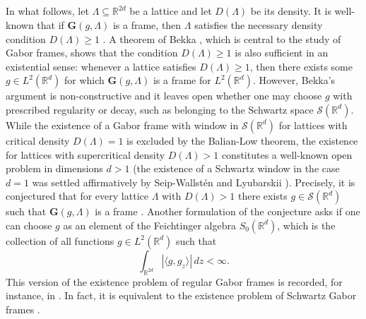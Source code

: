 \documentclass[reqno,a4paper,12pt]{amsart}
\numberwithin{equation}{section}
\def\R{{\mathbb R}}
\newcommand{\Rd}{{\R^d}}
\newcommand{\ltd}{{L^2(\R^d)}}
\newcommand\1{\mathds{1}}
\begin{document}
\subsection{}
In what follows, let $\Lambda \subseteq \R^{2d}$ be a lattice and let $D(\Lambda)$ be its density. It is well-known that if $\mathbf{G}(g,\Lambda)$ is a frame, then $\Lambda$ satisfies the necessary density condition $D(\Lambda)\geq 1$ \cite{heil2007history}.
A theorem of Bekka \cite{bekka2004square}, which is central to the study of Gabor frames, shows that the condition $D(\Lambda)\geq 1$ is also sufficient in an existential sense: whenever a lattice satisfies $D(\Lambda) \geq 1$, then there exists some $g \in \ltd$ for which $\mathbf{G}(g,\Lambda)$ is a frame for $L^2(\mathbb{R}^d)$. However, Bekka's argument is non-constructive and it leaves open whether one may choose $g$ with prescribed regularity or decay, such as belonging to the Schwartz space $\mathcal{S}(\Rd)$. While the existence of a Gabor frame with window in $\mathcal{S}(\Rd)$ for lattices with critical density $D(\Lambda)=1$ is excluded by the Balian-Low theorem, the existence for lattices with supercritical density $D(\Lambda)>1$ constitutes a well-known open problem in dimensions $d>1$ (the existence of a Schwartz window in the case $d=1$ was settled affirmatively by Seip-Wallstén and Lyubarskii \cite{Seip1992,Seip+1992+91+106,lyubarskiiframes}). Precisely, it is conjectured that for every lattice $\Lambda$ with $D(\Lambda)>1$ there exists $g \in \mathcal{S}(\Rd)$ such that $\mathbf{G}(g,\Lambda)$ is a frame \cite[p.~225]{grochenig2011multivariate}.
Another formulation of the conjecture asks if one can choose $g$ as an element of the Feichtinger algebra $S_0(\Rd)$, which is the collection of all functions $g \in \ltd$ such that
$$
\int_{\R^{2d}} |\langle g,g_z \rangle| \, dz < \infty.
$$
This version of the existence problem of regular Gabor frames is recorded, for instance, in \cite{jakobsen2020duality}. In fact, it is equivalent to the existence problem of Schwartz Gabor frames \cite[Proposition 4.4]{grochenig2020balian}.
\end{document}
